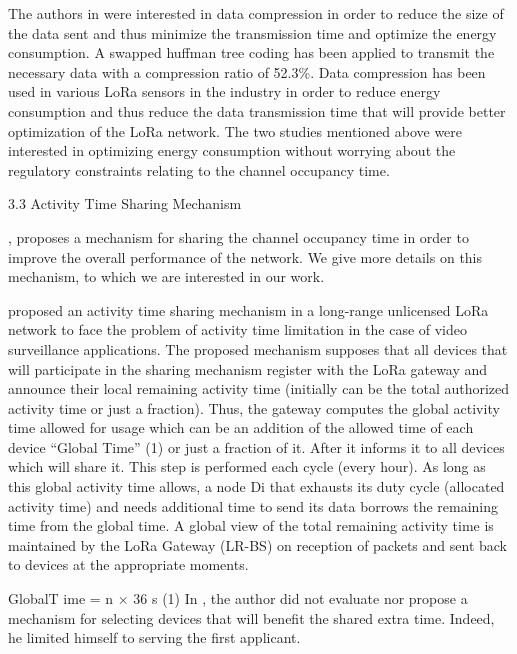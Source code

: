 The authors in \cite{jang_swapped_2016} were interested in data compression in order to reduce the size of the data sent and thus minimize the transmission time and optimize the energy consumption.
A swapped huffman tree coding has been applied to transmit the necessary data with a compression ratio of 52.3\%.
Data compression has been used in various LoRa sensors in the industry \cite{LorawanSpecification} in order to reduce energy consumption and thus reduce the data transmission time that will provide better optimization of the LoRa network.
The two studies mentioned above were interested in optimizing energy consumption without worrying about the regulatory constraints relating to the channel occupancy time.

3.3 Activity Time Sharing Mechanism 

\cite{pham_qos_2016},
	proposes a mechanism for sharing the channel occupancy time in order to improve the overall performance of the network.
We give more details on this mechanism,
	to which we are interested in our work.

\cite{pham_qos_2016} proposed an activity time sharing mechanism in a long-range unlicensed LoRa network to face the problem of activity time limitation in the case of video surveillance applications.
The proposed mechanism supposes that all devices that will participate in the sharing mechanism register with the LoRa gateway and announce their local remaining activity time (initially can be the total authorized activity time or just a fraction).
Thus,
	the gateway computes the global activity time allowed for usage which can be an addition of the allowed time of each device “Global Time” (1) or just a fraction of it.
After it informs it to all devices which will share it.
This step is performed each cycle (every hour).
As long as this global activity time allows,
	a node Di that exhausts its duty cycle (allocated activity time) and needs additional time to send its data borrows the remaining time from the global time.
A global view of the total remaining activity time is maintained by the LoRa Gateway (LR-BS) on reception of packets and sent back to devices at the appropriate moments.


GlobalT ime = n × 36 s (1) In \cite{pham_qos_2016},
	the author did not evaluate nor propose a mechanism for selecting devices that will benefit the shared extra time.
Indeed,
	he limited himself to serving the first applicant.


